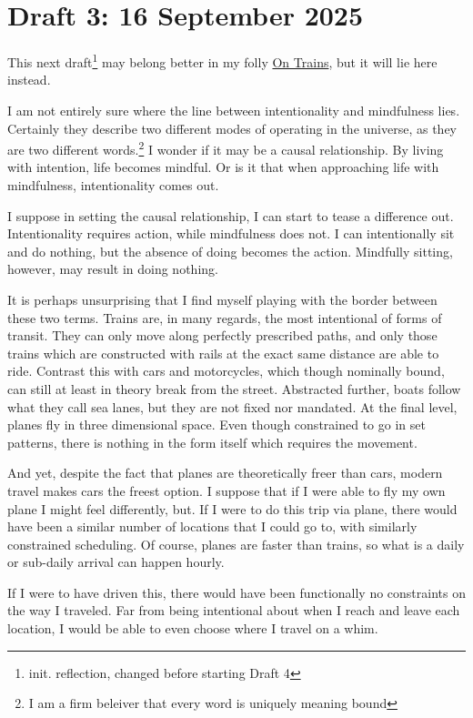 \documentclass[12pt]{article}
\renewcommand{\,}{\textsuperscript{,}}
\begin{document}
\section{Draft 3: 16 September 2025}
This next draft\footnote{init. reflection, changed before starting Draft 4} may belong better in my folly \href{trains.html}{On Trains}, but it will lie here instead.

I am not entirely sure where the line between intentionality and mindfulness lies.
Certainly they describe two different modes of operating in the universe, as they are two different words.\footnote{I am a firm beleiver that every word is uniquely meaning bound}
I wonder if it may be a causal relationship.
By living with intention, life becomes mindful.
Or is it that when approaching life with mindfulness, intentionality comes out.

I suppose in setting the causal relationship, I can start to tease a difference out.
Intentionality requires action, while mindfulness does not.
I can intentionally sit and do nothing, but the absence of doing becomes the action.
Mindfully sitting, however, may result in doing nothing.

It is perhaps unsurprising that I find myself playing with the border between these two terms.
Trains are, in many regards, the most intentional of forms of transit.
They can only move along perfectly prescribed paths, and only those trains which are constructed with rails at the exact same distance are able to ride.
Contrast this with cars and motorcycles, which though nominally bound, can still at least in theory break from the street.
Abstracted further, boats follow what they call sea lanes, but they are not fixed nor mandated.
At the final level, planes fly in three dimensional space.
Even though constrained to go in set patterns, there is nothing in the form itself which requires the movement.

And yet, despite the fact that planes are theoretically freer than cars, modern travel makes cars the freest option.
I suppose that if I were able to fly my own plane I might feel differently, but.
If I were to do this trip via plane, there would have been a similar number of locations that I could go to, with similarly constrained scheduling.
Of course, planes are faster than trains, so what is a daily or sub-daily arrival can happen hourly.

If I were to have driven this, there would have been functionally no constraints on the way I traveled.
Far from being intentional about when I reach and leave each location, I would be able to even choose where I travel on a whim.
\end{document}
